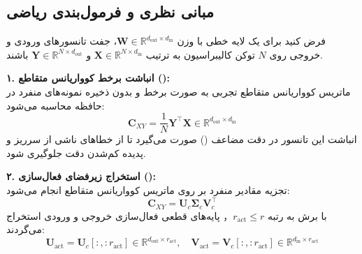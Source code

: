 \subsection{مبانی نظری و فرمول‌بندی ریاضی}
فرض کنید برای یک لایه خطی با وزن $\mathbf{W} \in \mathbb{R}^{d_{\text{out}} \times d_{\text{in}}}$، جفت تانسورهای ورودی و خروجی روی $N$ توکن کالیبراسیون به ترتیب $\mathbf{X} \in \mathbb{R}^{N \times d_{\text{in}}}$ و $\mathbf{Y} \in \mathbb{R}^{N \times d_{\text{out}}}$ باشند.

\textbf{۱. انباشت برخط کوواریانس متقاطع ():} \\
ماتریس کوواریانس متقاطع تجربی به صورت برخط و بدون ذخیره نمونه‌های منفرد در حافظه محاسبه می‌شود:
\begin{equation}
\mathbf{C}_{XY} = \frac{1}{N} \mathbf{Y}^\top \mathbf{X} \in \mathbb{R}^{d_{\text{out}} \times d_{\text{in}}}
\end{equation}
انباشت این تانسور در دقت مضاعف () صورت می‌گیرد تا از خطاهای ناشی از سرریز و پدیده کم‌شدن دقت جلوگیری شود.

\textbf{۲. استخراج زیرفضای فعال‌سازی ():} \\
تجزیه مقادیر منفرد بر روی ماتریس کوواریانس متقاطع انجام می‌شود:
\begin{equation}
\mathbf{C}_{XY} = \mathbf{U}_c \mathbf{\Sigma}_c \mathbf{V}_c^\top
\end{equation}
با برش به رتبه $r_{\text{act}} \le r$， پایه‌های قطعی فعال‌سازی خروجی و ورودی استخراج می‌گردند:
\begin{equation}
\mathbf{U}_{\text{act}} = \mathbf{U}_{c}[:, :r_{\text{act}}] \in \mathbb{R}^{d_{\text{out}} \times r_{\text{act}}}, \quad \mathbf{V}_{\text{act}} = \mathbf{V}_{c}[:, :r_{\text{act}}] \in \mathbb{R}^{d_{\text{in}} \times r_{\text{act}}}
\end{equation}

